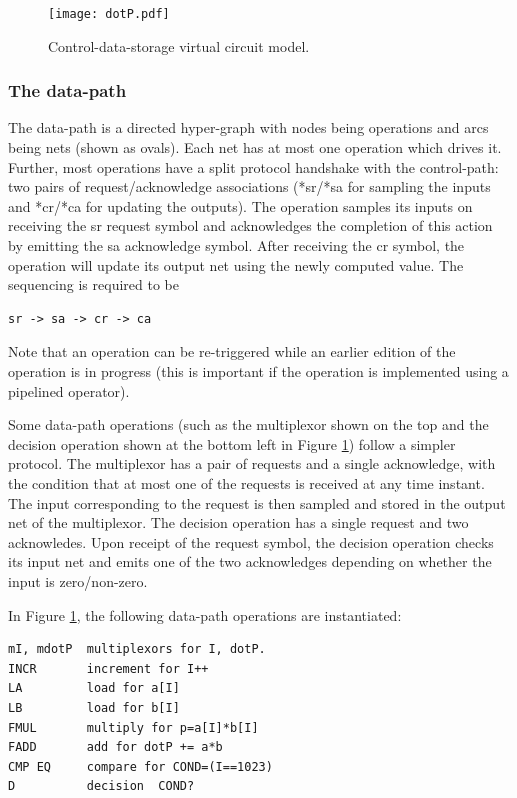 \documentclass[conference]{IEEEtran}
\begin{document}
\begin{figure}[ht]
  \centering
  \texttt{[image: dotP.pdf]}
  \caption{Control-data-storage virtual circuit model.}
  \label{fig:dotP}
\end{figure}



\subsubsection{The data-path}

The data-path is a directed hyper-graph with nodes being
operations and arcs being nets (shown as ovals).  Each
net has at most one operation which drives it.  Further, most
operations have  a split protocol handshake with
the control-path:  two pairs of request/acknowledge 
associations (*sr/*sa for sampling the inputs  and *cr/*ca for
updating the outputs).    The operation samples its inputs
on receiving the sr request symbol and acknowledges the completion
of this action by emitting the sa acknowledge symbol.  After receiving
the cr symbol, the operation will update its output net
using the newly computed value. The sequencing is required to be
\begin{verbatim}
sr -> sa -> cr -> ca
\end{verbatim}
Note that an operation can be re-triggered while an earlier
edition of the operation
is in progress (this is important if the operation is implemented
using a pipelined operator).

Some data-path operations (such as the multiplexor
shown on the top and the decision operation shown at the bottom
left in Figure \ref{fig:dotP}) follow a simpler protocol.  The multiplexor
has a pair of requests and a single acknowledge, with the condition
that at most one of the requests is received at any time instant.
The input corresponding to the request is then sampled and stored
in the output net of the multiplexor.
The decision operation has a single request and two acknowledes.  Upon
receipt of the request symbol, the decision operation checks its input net
and emits one of the two acknowledges depending on whether the input
is zero/non-zero.

In Figure \ref{fig:dotP}, the following data-path operations
are instantiated:
\begin{verbatim}
mI, mdotP  multiplexors for I, dotP.
INCR       increment for I++
LA         load for a[I]
LB         load for b[I]
FMUL       multiply for p=a[I]*b[I]
FADD       add for dotP += a*b
CMP EQ     compare for COND=(I==1023)
D          decision  COND?
\end{verbatim}
\end{document}

